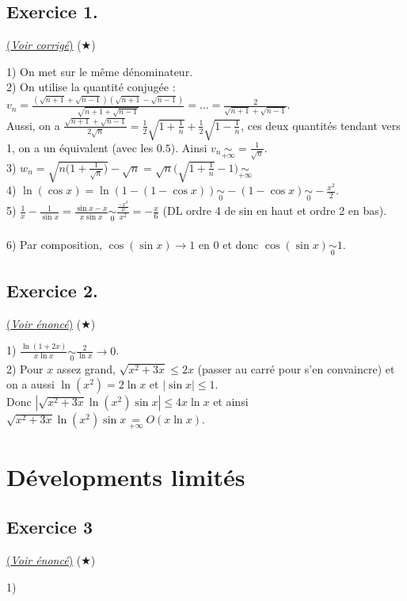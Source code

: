 \documentclass{article}
\newcommand{\ra}{\rightarrow}
\newcommand{\0}{\emptyset}
\begin{document}
\subsection*{Exercice 1.}
\hyperref[subsec:ex1]{(\textit{Voir corrigé})} ($\bigstar$)
\label{subsec:corr1}
\begin{flushleft}
1) On met sur le même dénominateur.\\
2) On utilise la quantité conjugée : $v_n = \frac{(\sqrt{n+1} + \sqrt{n-1})(\sqrt{n+1}-\sqrt{n-1})}{\sqrt{n+1 + \sqrt{n-1}}} = \dots = \frac{2}{\sqrt{n+1}+\sqrt{n-1}}$.\\
Aussi, on a $\frac{\sqrt{n+1}+\sqrt{n-1}}{2\sqrt{n}} = \frac{1}{2}\sqrt{1+\frac{1}{n}} + \frac{1}{2}\sqrt{1-\frac{1}{n}}$, ces deux quantités tendant vers 1, on a un équivalent (avec les $0.5$).
Ainsi $v_n \underset{+\infty}{\sim} = \frac{1}{\sqrt{n}}$.\\
3) $w_n = \sqrt{n\Big(1+\frac{1}{\sqrt{n}}\Big)} - \sqrt{n} = \sqrt{n}\Big(\sqrt{1+\frac{1}{n}} -1\Big) \underset{+\infty}{\sim} $\\
4) $\ln(\cos x) = \ln(1 - (1- \cos x)) \underset{0}{\sim} - (1-\cos x) \underset{0}{\sim} - \frac{x^2}{2}$.\\
5) $\frac{1}{x}-\frac{1}{\sin x} = \frac{\sin x -x}{x\sin x} \underset{0}{\sim} \frac{\frac{-x^3}{3!}}{x^2} = -\frac{x}{6}$ (DL ordre 4 de sin en haut et ordre 2 en bas).\\
\text{ }\\
6) Par composition, $\cos (\sin x) \ra 1$ en 0 et donc $\cos (\sin x) \underset{0}{\sim} 1$.\\
\end{flushleft}

\subsection*{Exercice 2.}
\hyperref[subsec:ex2]{(\textit{Voir énoncé})} ($\bigstar$)
\label{subsec:corr2}
\begin{flushleft}
1) $\frac{\ln(1+2x)}{x\ln x} \underset{0}{\sim} \frac{2}{\ln x} \longrightarrow 0 $.\\
2) Pour $x$ assez grand, $\sqrt{x^2 + 3x}\leqslant 2x$ (passer au carré pour s'en convaincre) et on a aussi $\ln(x^2) = 2 \ln x$ et $| \sin x | \leqslant 1$.\\
Donc $|\sqrt{x^2 + 3x} \ln(x^2) \sin x |\leqslant 4x\ln x$ et ainsi $\sqrt{x^2 + 3x} \ln(x^2) \sin x \underset{+\infty}{=} O(x \ln x)$.\\
\end{flushleft}

\section*{Dévelopments limités}
\subsection*{Exercice 3}
\hyperref[subsec:ex3]{(\textit{Voir énoncé})} ($\bigstar$)
\label{subsec:corr3}
\begin{flushleft}
1)
\end{flushleft}
\end{document}
